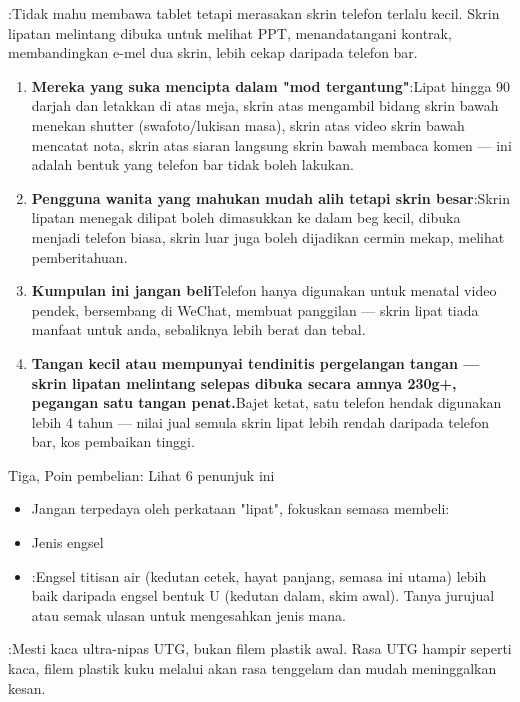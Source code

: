 :Tidak mahu membawa tablet tetapi merasakan skrin telefon terlalu kecil. Skrin lipatan melintang dibuka untuk melihat PPT, menandatangani kontrak, membandingkan e-mel dua skrin, lebih cekap daripada telefon bar.

\begin{enumerate}
  \item \textbf{Mereka yang suka mencipta dalam "mod tergantung"}:Lipat hingga 90 darjah dan letakkan di atas meja, skrin atas mengambil bidang skrin bawah menekan shutter (swafoto/lukisan masa), skrin atas video skrin bawah mencatat nota, skrin atas siaran langsung skrin bawah membaca komen — ini adalah bentuk yang telefon bar tidak boleh lakukan.
  \item \textbf{Pengguna wanita yang mahukan mudah alih tetapi skrin besar}:Skrin lipatan menegak dilipat boleh dimasukkan ke dalam beg kecil, dibuka menjadi telefon biasa, skrin luar juga boleh dijadikan cermin mekap, melihat pemberitahuan.
  \item \textbf{Kumpulan ini jangan beli}Telefon hanya digunakan untuk menatal video pendek, bersembang di WeChat, membuat panggilan — skrin lipat tiada manfaat untuk anda, sebaliknya lebih berat dan tebal.
  \item \textbf{Tangan kecil atau mempunyai tendinitis pergelangan tangan — skrin lipatan melintang selepas dibuka secara amnya 230g+, pegangan satu tangan penat.}Bajet ketat, satu telefon hendak digunakan lebih 4 tahun — nilai jual semula skrin lipat lebih rendah daripada telefon bar, kos pembaikan tinggi.
\end{enumerate}

\begin{tcbwarn}{Tiga, Poin pembelian: Lihat 6 penunjuk ini}
\begin{itemize}
  \item Jangan terpedaya oleh perkataan "lipat", fokuskan semasa membeli:
  \item Jenis engsel
  \item :Engsel titisan air (kedutan cetek, hayat panjang, semasa ini utama) lebih baik daripada engsel bentuk U (kedutan dalam, skim awal). Tanya jurujual atau semak ulasan untuk mengesahkan jenis mana.
\end{itemize}

\end{tcbwarn}


:Mesti kaca ultra-nipas UTG, bukan filem plastik awal. Rasa UTG hampir seperti kaca, filem plastik kuku melalui akan rasa tenggelam dan mudah meninggalkan kesan.


